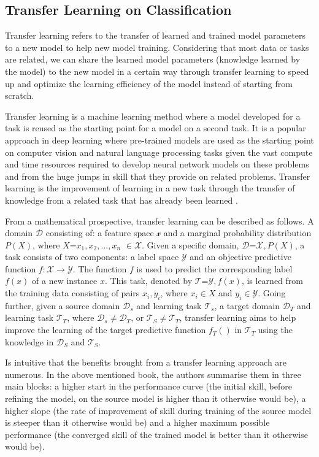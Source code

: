 \documentclass[conference]{IEEEtran}
\begin{document}
\subsection{Transfer Learning on Classification}
\label{transfer}
Transfer learning refers to the transfer of learned and trained model parameters to a new model to help new model training. Considering that most data or tasks are related, we can share the learned model parameters (knowledge learned by the model) to the new model in a certain way through transfer learning to speed up and optimize the learning efficiency of the model instead of starting from scratch.

Transfer learning is a machine learning method where a model developed for a task is reused as the starting point for a model on a second task. It is a popular approach in deep learning where pre-trained models are used as the starting point on computer vision and natural language processing tasks given the vast compute and time resources required to develop neural network models on these problems and from the huge jumps in skill that they provide on related problems. Transfer learning is the improvement of learning in a new task through the transfer of knowledge from a related task that has already been learned \cite{olivas-handbook}.

From a mathematical prospective, transfer learning can be described as follows. A domain $\mathcal D$ consisting of: a feature space $\mathcal x$ and a marginal probability distribution $P(X)$, where $X$={$x_1,x_2,...,x_n$} $\in \mathcal X$. Given a specific domain, $\mathcal D$={$\mathcal X,P(X)$}, a task consists of two components: a label space $\mathcal Y$ and an objective predictive function $f:\mathcal X \to \mathcal Y$. The function $f$ is used to predict the corresponding label $f(x)$ of a new instance $x$. This task, denoted by $\mathcal T$={$\mathcal Y,f(x)$}, is learned from the training data consisting of pairs {$x_i,y_i$}, where $x_i \in X$ and $y_i \in \mathcal Y$. Going further, given a source domain $\mathcal D_s$ and learning task $\mathcal T_s$, a target domain $\mathcal D_T$ and learning task $\mathcal T_T$, where $\mathcal D_s \neq \mathcal D_T$, or $\mathcal T_S \neq \mathcal T_T$, transfer learning aims to help improve the learning of the target predictive function $f_T()$ in $\mathcal T_T$ using the knowledge in $\mathcal D_S$ and $\mathcal T_S$.  

Is intuitive that the benefits brought from a transfer learning approach are numerous. In the above mentioned book, the authors summarise them in three main blocks: a higher start in the performance curve (the initial skill, before refining the model, on the source model is higher than it otherwise would be), a higher slope (the rate of improvement of skill during training of the source model is steeper than it otherwise would be) and a higher maximum possible performance (the converged skill of the trained model is better than it otherwise would be).
\end{document}

